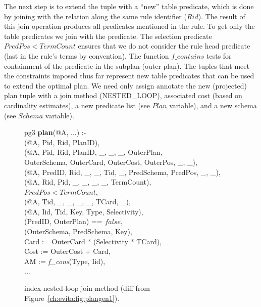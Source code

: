 The next step is to extend the  tuple with a ``new'' table predicate,
which is done by joining with the  relation along the same rule
identifier ($Rid$).  The result of this join operation produces all predicates
mentioned in the rule.  To get only the table predicates we join with the
 predicate.  The selection predicate $PredPos < TermCount$ ensures that
we do not consider the rule head predicate (last in the rule's terms by
convention).  The function $f\_contains$ tests for containment of the predicate
in the subplan (outer plan).  The tuples that meet the constraints imposed thus
far represent new table predicates that can be used to extend the optimal plan.
We need only assign annotate the new (projected) plan tuple with a join method
(NESTED\_LOOP), associated cost (based on cardinality estimates), a new
predicate list (see $Plan$ variable), and a new schema (see $Schema$ variable).

\begin{figure}
\ssp
\centering
\begin{boxedminipage}{\linewidth}
pg3 {\bf plan}(@A, ...) :-\\
(@A, Pid, Rid, PlanID),\\
(@A, Pid, Rid, PlanID, \_, \_, \_, OuterPlan, \\
\datalogspace \datalogspace OuterSchema, OuterCard, OuterCost, OuterPos, \_, \_),  \\   
(@A, PredID, Rid, \_, \_, Tid, \_, PredSchema, PredPos, \_, \_),\\
(@A, Rid, Pid, \_, \_, \_, \_, TermCount), \\
\datalogspace $PredPos < TermCount$,\\
(@A, Tid, \_, \_, \_, \_, TCard, \_),\\
(@A, Iid, Tid, Key, Type, Selectivity),\\
(PredID, OuterPlan) == $false$,\\
(OuterSchema, PredSchema, Key),\\
\datalogspace Card   := OuterCard * (Selectivity * TCard),\\
\datalogspace Cost   := OuterCost + Card,\\
\datalogspace AM := {\em f\_cons}(Type, Iid),\\
\datalogspace ...
\end{boxedminipage}
\caption{\label{ch:evita:fig:plangen2}index-nested-loop join method (diff from Figure~\ref{ch:evita:fig:plangen1}).}
\end{figure}

